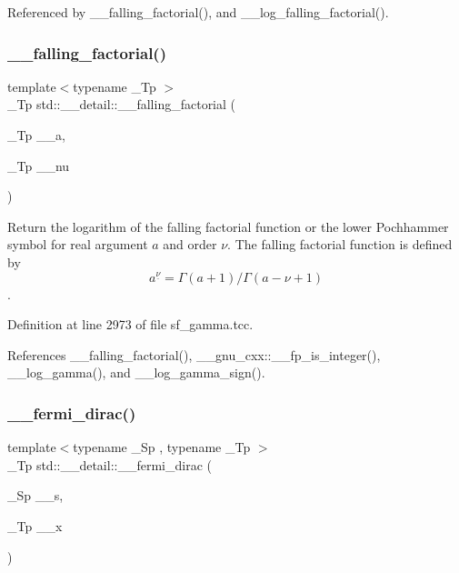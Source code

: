 Referenced by \+\_\+\+\_\+falling\+\_\+factorial(), and \+\_\+\+\_\+log\+\_\+falling\+\_\+factorial().

\mbox{\label{namespacestd_1_1____detail_a7cde2bf518e7ea3a0db2bec8f41b6465}} 
\subsubsection{\texorpdfstring{\+\_\+\+\_\+falling\+\_\+factorial()}{\_\_falling\_factorial()}\hspace{0.1cm}{\footnotesize\ttfamily [2/2]}}
{\footnotesize\ttfamily template$<$typename \+\_\+\+Tp $>$ \\
\+\_\+\+Tp std\+::\+\_\+\+\_\+detail\+::\+\_\+\+\_\+falling\+\_\+factorial (\begin{DoxyParamCaption}\item[{\+\_\+\+Tp}]{\+\_\+\+\_\+a,  }\item[{\+\_\+\+Tp}]{\+\_\+\+\_\+nu }\end{DoxyParamCaption})}



Return the logarithm of the falling factorial function or the lower Pochhammer symbol for real argument $ a $ and order $ \nu $. The falling factorial function is defined by \[ a^{\underline{\nu}} = \Gamma(a + 1) / \Gamma(a - \nu + 1) \]. 



Definition at line 2973 of file sf\+\_\+gamma.\+tcc.



References \+\_\+\+\_\+falling\+\_\+factorial(), \+\_\+\+\_\+gnu\+\_\+cxx\+::\+\_\+\+\_\+fp\+\_\+is\+\_\+integer(), \+\_\+\+\_\+log\+\_\+gamma(), and \+\_\+\+\_\+log\+\_\+gamma\+\_\+sign().

\mbox{\label{namespacestd_1_1____detail_a470e563c4e88c433f94dca391814dc61}} 
\subsubsection{\texorpdfstring{\+\_\+\+\_\+fermi\+\_\+dirac()}{\_\_fermi\_dirac()}}
{\footnotesize\ttfamily template$<$typename \+\_\+\+Sp , typename \+\_\+\+Tp $>$ \\
\+\_\+\+Tp std\+::\+\_\+\+\_\+detail\+::\+\_\+\+\_\+fermi\+\_\+dirac (\begin{DoxyParamCaption}\item[{\+\_\+\+Sp}]{\+\_\+\+\_\+s,  }\item[{\+\_\+\+Tp}]{\+\_\+\+\_\+x }\end{DoxyParamCaption})}

